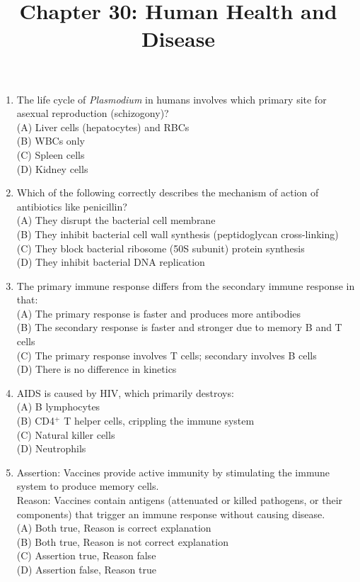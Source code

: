 \documentclass{article}
\begin{document}
\title{Chapter 30: Human Health and Disease}
\date{}
\maketitle

\begin{enumerate}[label=Q\arabic*.]

\item The life cycle of \textit{Plasmodium} in humans involves which primary site for asexual reproduction (schizogony)?
\\(A) Liver cells (hepatocytes) and RBCs
\\(B) WBCs only
\\(C) Spleen cells
\\(D) Kidney cells

\item Which of the following correctly describes the mechanism of action of antibiotics like penicillin?
\\(A) They disrupt the bacterial cell membrane
\\(B) They inhibit bacterial cell wall synthesis (peptidoglycan cross-linking)
\\(C) They block bacterial ribosome (50S subunit) protein synthesis
\\(D) They inhibit bacterial DNA replication

\item The primary immune response differs from the secondary immune response in that:
\\(A) The primary response is faster and produces more antibodies
\\(B) The secondary response is faster and stronger due to memory B and T cells
\\(C) The primary response involves T cells; secondary involves B cells
\\(D) There is no difference in kinetics

\item AIDS is caused by HIV, which primarily destroys:
\\(A) B lymphocytes
\\(B) CD4$^+$ T helper cells, crippling the immune system
\\(C) Natural killer cells
\\(D) Neutrophils

\item Assertion: Vaccines provide active immunity by stimulating the immune system to produce memory cells.\\
Reason: Vaccines contain antigens (attenuated or killed pathogens, or their components) that trigger an immune response without causing disease.
\\(A) Both true, Reason is correct explanation
\\(B) Both true, Reason is not correct explanation
\\(C) Assertion true, Reason false
\\(D) Assertion false, Reason true


\end{enumerate}
\end{document}
